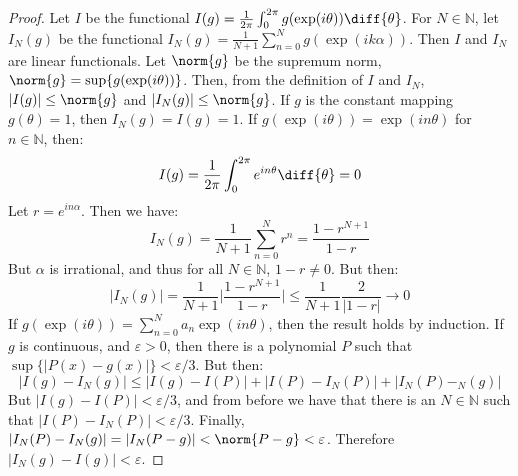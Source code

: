         \begin{proof}
            Let $I$ be the functional
            $I(g)=\frac{1}{2\pi}%
             \int_{0}^{2\pi}g(\exp(i\theta))\diff{\theta}$.
            For $N\in\mathbb{N}$, let $I_{N}(g)$ be the functional 
            $I_{N}(g)=\frac{1}{N+1}\sum_{n=0}^{N}g(\exp(ik\alpha))$.
            Then $I$ and $I_{N}$ are linear functionals.
            Let $\norm{g}$ be the supremum norm,
            $\norm{g}=\sup\{g(\exp(i\theta))\}$. Then, from the
            definition of $I$ and $I_{N}$,
            $|I(g)|\leq\norm{g}$ and $|I_{N}(g)|\leq\norm{g}$.
            If $g$ is the constant mapping $g(\theta)=1$, then
            $I_{N}(g)=I(g)=1$. If $g(\exp(i\theta))=\exp(in\theta)$
            for $n\in\mathbb{N}$, then:
            \begin{equation*}
                I(g)
                =\frac{1}{2\pi}\int_{0}^{2\pi}e^{in\theta}\diff{\theta}
                =0
            \end{equation*}
            Let $r=e^{in\alpha}$. Then we have:
            \begin{equation*}
                I_{N}(g)=\frac{1}{N+1}\sum_{n=0}^{N}r^{n}
                =\frac{1-r^{N+1}}{1-r}
            \end{equation*}
            But $\alpha$ is irrational, and thus for all
            $N\in\mathbb{N}$, $1-r\ne{0}$. But then:
            \begin{equation*}
                |I_{N}(g)|=\frac{1}{N+1}\Big|\frac{1-r^{N+1}}{1-r}\Big|
                \leq\frac{1}{N+1}\frac{2}{|1-r|}\rightarrow{0}
            \end{equation*}
            If $g(\exp(i\theta))=\sum_{n=0}^{N}a_{n}\exp(in\theta)$,
            then the result holds by induction. If $g$ is continuous,
            and $\varepsilon>0$, then there is a polynomial
            $P$ such that $\sup\{|P(x)-g(x)|\}<\varepsilon/3$. But then:
            \begin{equation*}
                |I(g)-I_{N}(g)|\leq|I(g)-I(P)|+|I(P)-I_{N}(P)|+
                |I_{N}(P)-_{N}(g)|
            \end{equation*}
            But $|I(g)-I(P)|<\varepsilon/3$, and from before we have
            that there is an $N\in\mathbb{N}$ such that
            $|I(P)-I_{N}(P)|<\varepsilon/3$. Finally,
            $|I_{N}(P)-I_{N}(g)|=|I_{N}(P-g)|<\norm{P-g}<\varepsilon$.
            Therefore $|I_{N}(g)-I(g)|<\varepsilon$.
        \end{proof}
